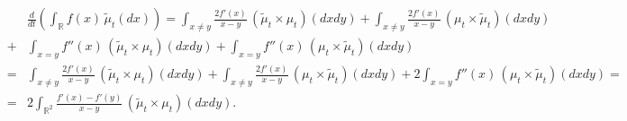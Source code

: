 \documentclass[a4paper,twoside,11pt]{article}
\theoremstyle{plain}
\newtheorem{remark}[theorem]{Remark}
\theoremstyle{definition}
\theoremstyle{remark}
\newcommand\R{\mathbb R}         %
\begin{document}
%

\begin{eqnarray*}  &&\frac{d}{dt}\left(\int_\R f(x)\, \tilde{\mu}_t(dx)\right) =  \int_{x\not=y} \frac{2f'(x)}{x-y} \,(\tilde{\mu}_t\times\mu_t)(dxdy) + 
 \int_{x\not=y} \frac{2f'(x)}{x-y} \,(\mu_t\times\tilde{\mu}_t)(dxdy) \\
&+& \int_{x=y} f''(x) \, (\tilde{\mu}_t\times\mu_t)(dxdy) + \int_{x=y} f''(x) \, (\mu_t\times\tilde{\mu}_t)(dxdy) \\
&=&   \int_{x\not=y} \frac{2f'(x)}{x-y} \,(\tilde{\mu}_t\times \mu_t)(dxdy)+ 
 \int_{x\not=y} \frac{2f'(x)}{x-y} \,(\mu_t\times\tilde{\mu}_t)(dxdy) +  2\int_{x=y} f''(x) \, (\mu_t\times\tilde{\mu}_t)(dxdy)=\\
&=&   2\int_{\R^2} \frac{f'(x)-f'(y)}{x-y} \,(\tilde{\mu}_t\times \mu_t)(dxdy). \end{eqnarray*} 




 
\end{document}
